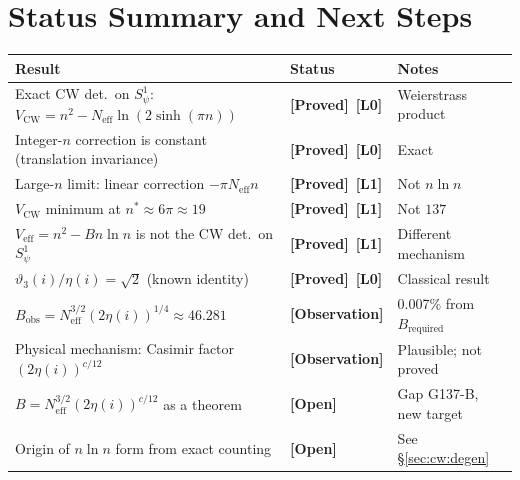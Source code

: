 \documentclass[12pt,a4paper]{article}
\theoremstyle{definition}
\theoremstyle{remark}
\newcommand{\PROVED}{\textbf{[Proved]}}
\newcommand{\OPEN}{\textbf{[Open]}}
\newcommand{\OBS}{\textbf{[Observation]}}
\newcommand{\Lone}{\textbf{[L1]}}
\newcommand{\Lzero}{\textbf{[L0]}}
\begin{document}
\section{Status Summary and Next Steps}
\label{sec:cw:status}

\begin{center}
\renewcommand{\arraystretch}{1.4}
\begin{tabular}{p{7.2cm} p{2.5cm} p{3.8cm}}
\toprule
\textbf{Result} & \textbf{Status} & \textbf{Notes} \\
\midrule
Exact CW det.\ on $S^1_\psi$:
  $V_{\mathrm{CW}} = n^2 - N_{\mathrm{eff}}\ln(2\sinh(\pi n))$
  & \PROVED\ \Lzero & Weierstrass product \\
Integer-$n$ correction is constant (translation invariance)
  & \PROVED\ \Lzero & Exact \\
Large-$n$ limit: linear correction $-\pi N_{\mathrm{eff}} n$
  & \PROVED\ \Lone & Not $n\ln n$ \\
$V_{\mathrm{CW}}$ minimum at $n^* \approx 6\pi \approx 19$
  & \PROVED\ \Lone & Not $137$ \\
$V_{\mathrm{eff}} = n^2 - Bn\ln n$ is not the CW det.\ on $S^1_\psi$
  & \PROVED\ \Lone & Different mechanism \\
\midrule
$\vartheta_3(i)/\eta(i) = \sqrt{2}$ (known identity)
  & \PROVED\ \Lzero & Classical result \\
$B_{\mathrm{obs}} = N_{\mathrm{eff}}^{3/2}(2\eta(i))^{1/4} \approx 46.281$
  & \OBS & 0.007\% from $B_{\mathrm{required}}$ \\
Physical mechanism: Casimir factor $(2\eta(i))^{c/12}$
  & \OBS & Plausible; not proved \\
\midrule
$B = N_{\mathrm{eff}}^{3/2}(2\eta(i))^{c/12}$ as a theorem
  & \OPEN & Gap G137-B, new target \\
Origin of $n\ln n$ form from exact counting
  & \OPEN & See §\ref{sec:cw:degen} \\
\bottomrule
\end{tabular}
\end{center}
\end{document}
